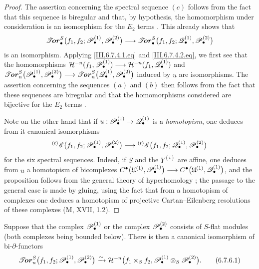 \begin{proof}
The assertion concerning the spectral sequence $(c)$ follows
from the fact that this sequence is biregular and that, by hypothesis, the
homomorphism under consideration is an isomorphism for the
$E_2$ terms .  This already shows that
\[
\begin{split}
  \boldsymbol{\mathscr{T}\!or}_\bullet^S
  \bigl(
    f_1,f_2;
    \mathscr{P}_\bullet^{(1)},\mathscr{P}_\bullet^{(2)}
  \bigr)
  \longrightarrow
  \boldsymbol{\mathscr{T}\!or}_\bullet^S
  \bigl(
    f_1,f_2;
    \mathscr{Q}_\bullet^{(1)},\mathscr{P}_\bullet^{(2)}
  \bigr)
\end{split}
\]
is an isomorphism.  Applying \eqref{III.6.7.4.1.eq} and
\eqref{III.6.7.4.2.eq}, we first see that the homomorphisms $\mathcal{H}^{-n}(f_1,\mathscr{P}_\bullet^{(1)})
\longrightarrow
\mathcal{H}^{-n}(f_1,\mathscr{Q}_\bullet^{(1)})$
and $\boldsymbol{\mathscr{T}\!\mathit{or}}_n^S
\bigl(
\mathscr{P}_\bullet^{(1)},\mathscr{P}_\bullet^{(2)}
\bigr)
\longrightarrow
\boldsymbol{\mathscr{T}\!\mathit{or}}_n^S
\bigl(
\mathscr{Q}_\bullet^{(1)},\mathscr{P}_\bullet^{(2)}
\bigr)$
induced by $u$ are isomorphisms.  The assertion concerning the sequences
$(a)$ and $(b)$ then follows from the fact that these sequences are
biregular  and that the homomorphisms considered are
bijective for the $E_2$ terms .

Note on the other hand that if
$u:\mathscr{P}_\bullet^{(1)}\to\mathscr{Q}_\bullet^{(1)}$ is a
\emph{homotopism}, one deduces from it canonical isomorphisms
\[
  {}^{(t)}\mathscr{E}
  \bigl(
    f_1,f_2;
    \mathscr{P}_\bullet^{(1)},\mathscr{P}_\bullet^{(2)}
  \bigr)
  \longrightarrow
  {}^{(t)}\mathscr{E}
  \bigl(
    f_1,f_2;
    \mathscr{Q}_\bullet^{(1)},\mathscr{P}_\bullet^{(2)}
  \bigr)
\]
for the six spectral sequences.  Indeed, if $S$ and the
$Y^{(i)}$ are affine, one deduces from $u$ a homotopism of
bicomplexes $C^\bullet
\bigl(
\mathfrak U^{(1)},\mathscr{P}_\bullet^{(1)}
\bigr)
\longrightarrow
C^\bullet
\bigl(
\mathfrak U^{(1)},\mathscr{Q}_\bullet^{(1)}
\bigr)$,
and the proposition follows from the general theory of
hyperhomology ; the passage to the general
case is made by gluing, using the fact that from a homotopism of
complexes one deduces a homotopism of projective
Cartan--Eilenberg resolutions of these complexes
(\textnormal{M}, XVII, 1.2).
\end{proof}

\begin{proposition}[6.7.6]
\label{III.6.7.6}
Suppose that the complex $\mathscr{P}_\bullet^{(1)}$ or the complex
$\mathscr{P}_\bullet^{(2)}$ consists of $S$-flat modules (both
complexes being bounded below).  There is then a canonical
isomorphism of bi-$\partial$-functors
\[
  \boldsymbol{\mathscr{T}\!or}_n^S
  \bigl(
    f_1,f_2;
    \mathscr{P}_\bullet^{(1)},\mathscr{P}_\bullet^{(2)}
  \bigr)
  \xrightarrow{\sim}
  \mathcal{H}^{-n}
  \bigl(
    f_1\times_Sf_2,
    \mathscr{P}_\bullet^{(1)}
    \otimes_S\mathscr{P}_\bullet^{(2)}
  \bigr).
  \tag{6.7.6.1}\label{III.6.7.6.1.eq}
\]
\end{proposition}

